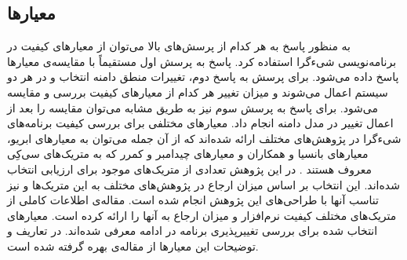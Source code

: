 \subsection{معیارها}
 به منظور پاسخ به هر کدام از پرسش‌های بالا می‌توان از معیارهای کیفیت در برنامه‌نویسی شیءگرا  استفاده کرد. پاسخ به پرسش اول مستقیماً با مقایسه‌ی معیارها پاسخ داده می‌شود. برای پرسش به پاسخ دوم، تغییرات منطق دامنه انتخاب و در هر دو سیستم اعمال می‌شوند و میزان تغییر هر کدام از معیارهای کیفیت بررسی و مقایسه می‌شود. برای پاسخ به پرسش سوم نیز به طریق مشابه می‌توان مقایسه را بعد از اعمال تغییر در مدل دامنه انجام داد. 
 معیارهای مختلفی برای بررسی کیفیت برنامه‌های شیءگرا در پژوهش‌های مختلف ارائه شده‌اند که از آن جمله می‌توان به معیارهای ابریو\cite{quality_metrics_1,quality_metrics_2}، معیارهای بانسیا و همکاران\cite{quality_metrics_3} و معیارهای چیدامبر و کمرر که به متریک‌های سی‌کِی معروف هستند \cite{quality_metrcs_ck}. در این پژوهش تعدادی از متریک‌های موجود برای ارزیابی انتخاب شده‌اند. این انتخاب بر اساس میزان ارجاع در پژوهش‌های مختلف به این متریک‌ها و نیز تناسب آنها با طراحی‌های این پژوهش انجام شده است. مقاله‌ی \cite{metrics_stateOfTheArt} اطلاعات کاملی از متریک‌های مختلف کیفیت نرم‌افزار و میزان ارجاع به آنها را ارائه کرده است. معیارهای انتخاب شده برای بررسی تغییرپذیری برنامه در ادامه معرفی شده‌اند. در تعاریف و توضیحات این معیارها از مقاله‌ی \cite{metrics_stateOfTheArt} بهره گرفته شده است.
